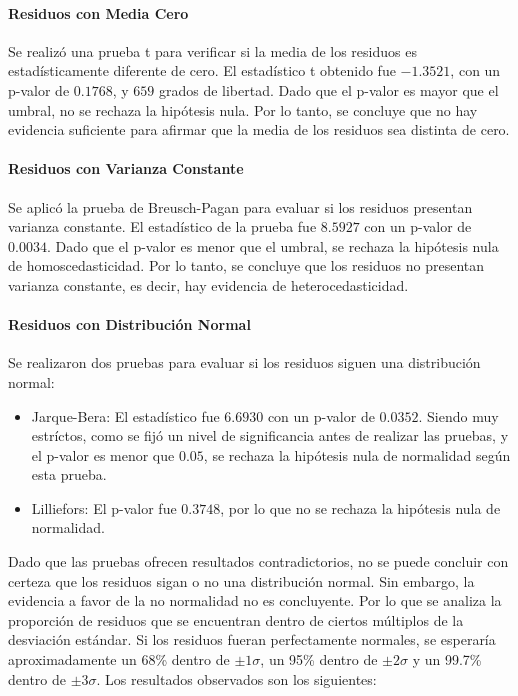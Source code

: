 \documentclass[12pt,letterpaper]{article}   %
\begin{document}
\paragraph{Residuos con Media Cero}
Se realizó una prueba t para verificar si la media de los residuos es estadísticamente diferente de cero. El estadístico t obtenido fue $-1.3521$, con un p-valor de $0.1768$, y $659$ grados de libertad. Dado que el p-valor es mayor que el umbral, no se rechaza la hipótesis nula. Por lo tanto, se concluye que no hay evidencia suficiente para afirmar que la media de los residuos sea distinta de cero.

\paragraph{Residuos con Varianza Constante}
Se aplicó la prueba de Breusch-Pagan para evaluar si los residuos presentan varianza constante. El estadístico de la prueba fue $8.5927$ con un p-valor de $0.0034$. Dado que el p-valor es menor que el umbral, se rechaza la hipótesis nula de homoscedasticidad. Por lo tanto, se concluye que los residuos no presentan varianza constante, es decir, hay evidencia de heterocedasticidad.

\paragraph{Residuos con Distribución Normal}
Se realizaron dos pruebas para evaluar si los residuos siguen una distribución normal:

\begin{itemize}
    \item Jarque-Bera: El estadístico fue $6.6930$ con un p-valor de $0.0352$. Siendo muy estríctos, como se fijó un nivel de significancia antes de realizar las pruebas, y el p-valor es menor que $0.05$, se rechaza la hipótesis nula de normalidad según esta prueba.
    \item Lilliefors: El p-valor fue $0.3748$, por lo que no se rechaza la hipótesis nula de normalidad.
\end{itemize}

Dado que las pruebas ofrecen resultados contradictorios, no se puede concluir con certeza que los residuos sigan o no una distribución normal. Sin embargo, la evidencia a favor de la no normalidad no es concluyente. Por lo que se analiza la proporción de residuos que se encuentran dentro de ciertos múltiplos de la desviación estándar. Si los residuos fueran perfectamente normales, se esperaría aproximadamente un 68\% dentro de $\pm1\sigma$, un 95\% dentro de $\pm2\sigma$ y un 99.7\% dentro de $\pm3\sigma$. Los resultados observados son los siguientes:
\end{document}
